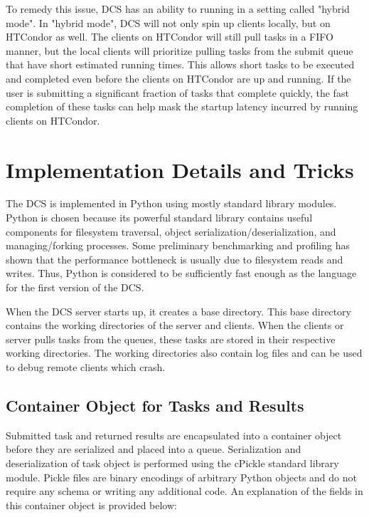 \documentclass{article}
\begin{document}
To remedy this issue, DCS has an ability to running in a setting called "hybrid mode". In "hybrid mode", DCS will not only spin up clients locally, but on HTCondor as well. The clients on HTCondor will still pull tasks in a FIFO manner, but the local clients will prioritize pulling tasks from the submit queue that have short estimated running times. This allows short tasks to be executed and completed even before the clients on HTCondor are up and running. If the user is submitting a significant fraction of tasks that complete quickly, the fast completion of these tasks can help mask the startup latency incurred by running clients on HTCondor.

\section{Implementation Details and Tricks}

The DCS is implemented in Python \cite{van2007python} using mostly standard library modules. Python is chosen because its powerful standard library contains useful components for filesystem traversal, object serialization/deserialization, and managing/forking processes. Some preliminary benchmarking and profiling has shown that the performance bottleneck is usually due to filesystem reads and writes. Thus, Python is considered to be sufficiently fast enough as the language for the first version of the DCS.

When the DCS server starts up, it creates a base directory. This base directory contains the working directories of the server and clients. When the clients or server pulls tasks from the queues, these tasks are stored in their respective working directories. The working directories also contain log files and can be used to debug remote clients which crash.

\subsection{Container Object for Tasks and Results}

Submitted task and returned results are encapsulated into a container object before they are serialized and placed into a queue. Serialization and deserialization of task object is performed using the cPickle standard library module. Pickle files are binary encodings of arbitrary Python objects and do not require any schema or writing any additional code. An explanation of the fields in this container object is provided below:
\end{document}
